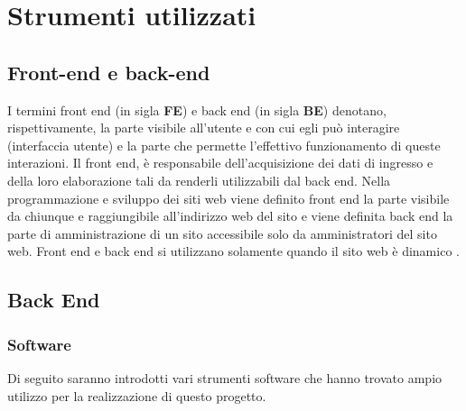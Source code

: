 \chapter{Strumenti utilizzati}

\section{Front-end e back-end}
I termini front end (in sigla \textbf{ FE}) e back end (in sigla \textbf{BE}) denotano, rispettivamente, la parte visibile all'utente e con cui egli può interagire (interfaccia utente) e la parte che permette l'effettivo funzionamento di queste interazioni.
Il front end, è responsabile dell'acquisizione dei dati di ingresso e della loro elaborazione tali da renderli utilizzabili dal back end. \newline
Nella programmazione e sviluppo dei siti web viene definito front end la parte visibile da chiunque e raggiungibile all'indirizzo web del sito e viene definita back end la parte di amministrazione di un sito accessibile solo da amministratori del sito web. Front end e back end si utilizzano solamente quando il sito web è dinamico \cite{sito_frontback_end}. 


\section{Back End}

\subsection{Software}
Di seguito saranno introdotti vari strumenti software che hanno trovato ampio utilizzo per la realizzazione di questo progetto.
